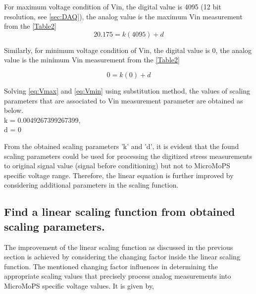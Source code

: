 \hspace{-9mm}For maximum voltage condition of Vin, the digital value is 4095	 (12 bit resolution, see \cref{sec:DAQ}), the analog value is the maximum \acrshort{Vin} measurement from the \cref{Table2}\\

\begin{equation}
20.175 = k(4095) + d
\label{eq:Vmax}
\end{equation}


\hspace{-9mm}Similarly, for minimum voltage condition of Vin, the digital value is 0, the analog value is the minimum \acrshort{Vin} measurement from the \cref{Table2}

\begin{equation}
0 = k(0) + d
\label{eq:Vmin}
\end{equation}


\hspace{-5mm}Solving \cref{eq:Vmax} and \cref{eq:Vmin} using substitution method, the values of scaling parameters that are associated to \acrshort{Vin} measurement parameter are obtained as below.\\

\hspace{-3.5mm}k = 0.0049267399267399,\\
\hspace{3mm}d = 0

From the obtained scaling parameters 'k' and 'd', it is evident that the found scaling parameters could be used for processing the digitized stress measurements to original signal value (signal before conditioning) but not to MicroMoPS specific voltage range. 
Therefore, the linear equation is further improved by considering additional parameters in the scaling function.   

\subsection{Find a linear scaling function from obtained scaling parameters.}\label{sec:linear function}
The improvement of the linear scaling function as discussed in the previous section is achieved by considering the changing factor inside the linear scaling function. 
The mentioned changing factor influences in determining the appropriate scaling values that precisely process analog measurements into MicroMoPS specific voltage values. It is given by,

